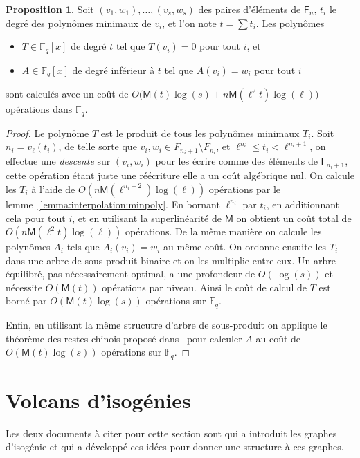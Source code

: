 \documentclass[10pt,a4paper]{book}
\theoremstyle{plain}
\theoremstyle{definition}
\theoremstyle{definition}
\theoremstyle{definition}
\newtheorem{prop}[thm]{Proposition}
\theoremstyle{definition}
\theoremstyle{remark}
\theoremstyle{remark}
\theoremstyle{definition}
\begin{document}
\begin{prop}\label{prop:interpol}
  Soit $(v_1,w_1),\dots,(v_s,w_s)$ des paires d'éléments de $\mathsf{F}_n$, 
  $t_i$ le degré des polynômes minimaux de $v_i$, et l'on note  $t=\sum t_i$. 
  Les polynômes
  \begin{itemize}
  \item $T\in \mathbb{F}_q[x]$ de degré $t$ tel que $T(v_i)=0$ pour tout $i$,
    et
  \item $A\in \mathbb{F}_q[x]$ de degré inférieur à $t$ tel que $A(v_i)=w_i$ pour
    tout $i$
  \end{itemize}
  sont calculés avec un coût de
  $O\bigl(\mathsf{M}(t)\log(s) + n\mathsf{M}(\ell^2t)\log(\ell)\bigr)$ opérations dans $\mathbb{F}_q$.
\end{prop}
\begin{proof}
  Le polynôme $T$ est le produit de tous les polynômes minimaux $T_i$. Soit 
  $n_i=v_\ell(t_i)$, de telle sorte que $v_i,w_i\in F_{n_i+1}\setminus F_{n_i}$,
  et $\ell^{n_i}\leqslant t_i<\ell^{n_i+1}$,
  on effectue une \emph{descente} sur $(v_i,w_i)$ pour les écrire comme des 
  éléments de $\mathsf{F}_{n_i+1}$, cette opération étant juste une réécriture
  elle a un coût algébrique nul. On calcule les $T_i$ à l'aide de
   $O(n\mathsf{M}(\ell^{n_i+2})\log(\ell))$ opérations par 
   le lemme~\ref{lemma:interpolation:minpoly}. En bornant 
  $\ell^{n_i}$ par $t_i$, en additionnant cela pour tout $i$, et en utilisant 
  la superlinéarité de $\mathsf{M}$ on obtient un coût total de 
  $O(n\mathsf{M}(\ell^2t)\log(\ell))$ opérations.
  De la même manière on calcule les polynômes $A_i$ tels que $A_i(v_i)=w_i$
  au même coût.
  On ordonne ensuite les $T_i$ dans une arbre de sous-produit binaire et 
  on les multiplie entre eux. Un arbre équilibré, pas nécessairement optimal,
  a une profondeur de $O(\log (s))$ et nécessite $O(\mathsf{M}(t))$ opérations
   par niveau. Ainsi le coût de calcul de $T$ est borné par 
   $O(\mathsf{M}(t)\log(s))$ opérations sur $\mathbb{F}_q$.
  
  Enfin, en utilisant la même strucutre d'arbre de sous-produit on applique le 
  théorème des restes chinois proposé dans~\cite[Chapter~10]{vzGJG03} pour 
  calculer $A$ au coût de $O(\mathsf{M}(t)\log(s))$ opérations sur $\mathbb{F}_q$.
\end{proof}




\chapter{Volcans d'isog\'enies}
\label{cha:volc:iso}
Les deux documents à citer pour cette section sont \cite{Kohel96} qui a introduit les graphes d'isogénie et   \cite{Fouquet01} qui a développé ces idées pour donner une structure à ces graphes.
\end{document}
